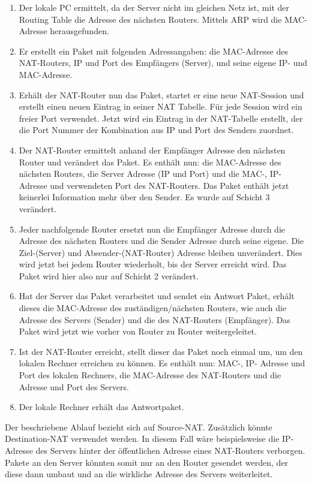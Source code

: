 \documentclass[12pt, a4paper]{article}
\begin{document}
	\begin{enumerate}
		\item Der lokale PC ermittelt, da der Server nicht im gleichen Netz ist, mit der Routing Table die Adresse des nächsten Routers. Mittels ARP wird die MAC-Adresse herausgefunden.
		\item Er erstellt ein Paket mit folgenden Adressangaben: die MAC-Adresse des NAT-Routers, IP und Port des Empfängers (Server), und seine eigene IP- und MAC-Adresse.
		\item Erhält der NAT-Router nun das Paket, startet er eine neue NAT-Session und erstellt einen neuen Eintrag in seiner NAT Tabelle. Für jede Session wird ein freier Port verwendet. Jetzt wird ein Eintrag in der NAT-Tabelle erstellt, der die Port Nummer der Kombination aus IP und Port des Senders zuordnet.
		\item Der NAT-Router ermittelt anhand der Empfänger Adresse den nächsten Router und verändert das Paket. Es enthält nun:
		die MAC-Adresse des nächsten Routers, die Server Adresse (IP und Port) und die MAC-, IP- Adresse und verwendeten Port des NAT-Routers. Das Paket enthält jetzt keinerlei Information mehr über den Sender. Es wurde auf Schicht 3 verändert.
		\item Jeder nachfolgende Router ersetzt nun die Empfänger Adresse durch die Adresse des nächsten Routers und die Sender Adresse durch seine eigene. Die Ziel-(Server) und Absender-(NAT-Router) Adresse bleiben unverändert. Dies wird jetzt bei jedem Router wiederholt, bis der Server erreicht wird. Das Paket wird hier also nur auf Schicht 2 verändert.
		\item Hat der Server das Paket verarbeitet und sendet ein Antwort Paket, erhält dieses die MAC-Adresse des zuständigen/nächsten Routers, wie auch die Adresse des Servers (Sender) und die des NAT-Routers (Empfänger). Das Paket wird jetzt wie vorher von Router zu Router weitergeleitet.
		\item Ist der NAT-Router erreicht, stellt dieser das Paket noch einmal um, um den lokalen Rechner erreichen zu können. Es enthält nun: MAC-, IP- Adresse und Port des lokalen Rechners, die MAC-Adresse des NAT-Routers und die Adresse und Port des Servers.
		\item Der lokale Rechner erhält das Antwortpaket.
	\end{enumerate}
	Der beschriebene Ablauf bezieht sich auf Source-NAT. Zusätzlich könnte Destination-NAT verwendet werden. In diesem Fall wäre beispielsweise die IP-Adresse des Servers hinter der öffentlichen Adresse eines NAT-Routers verborgen. Pakete an den Server könnten somit nur an den Router gesendet werden, der diese dann umbaut und an die wirkliche Adresse des Servers weiterleitet.
	
\end{document}
